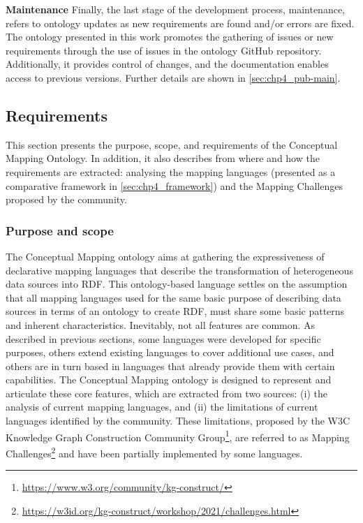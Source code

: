 \noindent\textbf{Maintenance}
Finally, the last stage of the development process, maintenance, refers to ontology updates as new requirements are found and/or errors are fixed. The ontology presented in this work promotes the gathering of issues or new requirements through the use of issues in the ontology GitHub repository. Additionally, it provides control of changes, and the documentation enables access to previous versions. Further details are shown in \cref{sec:chp4_pub-main}.



\subsection{Requirements}
\label{sec:chp4_requirements}
This section presents the purpose, scope, and requirements of the Conceptual Mapping Ontology. In addition, it also describes from where and how the requirements are extracted: analysing the mapping languages (presented as a comparative framework in \cref{sec:chp4_framework}) and the Mapping Challenges proposed by the community.

\subsubsection{Purpose and scope}

The Conceptual Mapping ontology aims at gathering the expressiveness of declarative mapping languages that describe the transformation of heterogeneous data sources into RDF. This ontology-based language settles on the assumption that all mapping languages used for the same basic purpose of describing data sources in terms of an ontology to create RDF, must share some basic patterns and inherent characteristics. Inevitably, not all features are common. As described in previous sections, some languages were developed for specific purposes, others extend existing languages to cover additional use cases, and others are in turn based in languages that already provide them with certain capabilities. The Conceptual Mapping ontology is designed to represent and articulate these core features, which are extracted from two sources: (i) the analysis of current mapping languages, and (ii) the limitations of current languages identified by the community. These limitations, proposed by the W3C Knowledge Graph Construction Community Group\footnote{\label{foot:kgc}\url{https://www.w3.org/community/kg-construct/}}, are referred to as Mapping Challenges\footnote{\label{foot:challenges}\url{https://w3id.org/kg-construct/workshop/2021/challenges.html}} and have been partially implemented by some languages. %

